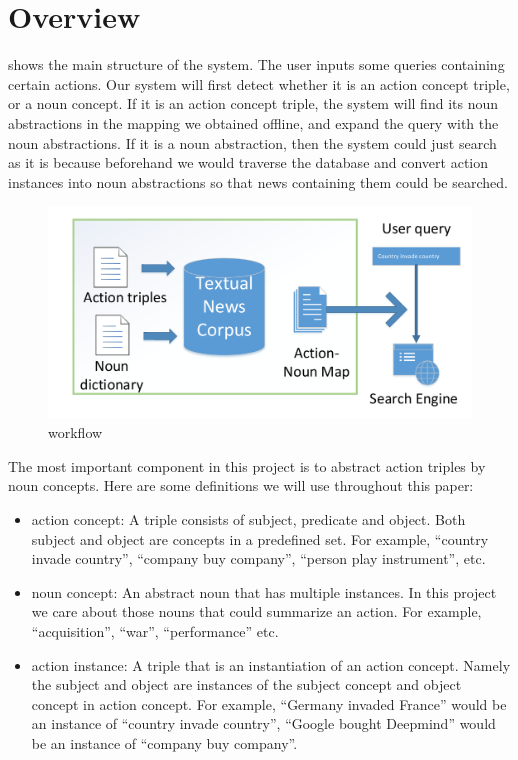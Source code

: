 \section{Overview}
 shows the main structure of the system. 
The user inputs some queries containing certain actions. Our system will
first detect whether it is an action concept triple, or a noun concept.
If it is an action concept triple, the system will find its noun abstractions
in the mapping we obtained offline, and expand the query with the noun 
abstractions. If it is a noun abstraction, then the system could just
search as it is because beforehand we would traverse the database
and convert action instances into noun abstractions so that news containing
them could be searched.

\begin{figure}[h!]
    \includegraphics[width=0.95\linewidth]{img/ac1.pdf}
    \caption{workflow}
    \label{fig:workflow}
\end{figure}


The most important component in this project is to
abstract action triples by noun concepts. Here are some definitions we will use throughout
this paper:
\begin{itemize}
\item action concept: A triple consists of subject, predicate and object. Both subject and object are concepts in a predefined set.
    For example, ``country invade country'', ``company buy company'', ``person play instrument'', etc.
\item noun concept: An abstract noun that has multiple instances. 
    In this project we care about those nouns that could summarize an action.  
    For example, ``acquisition'', ``war'', ``performance'' etc.
\item action instance: A triple that is an instantiation of an action concept. Namely the subject and object are instances of the
    subject concept and object concept in action concept. For example, ``Germany invaded France'' would be an instance of ``country 
        invade country'', ``Google bought Deepmind'' would be an instance of ``company buy company''.
\end{itemize}
